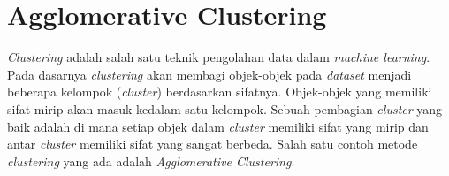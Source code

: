 %
%
%

\section{Agglomerative Clustering}
\label{sec:clustering}
\textit{Clustering} adalah salah satu teknik pengolahan data dalam \textit{machine learning}. Pada dasarnya \textit{clustering} akan membagi objek-objek pada \textit{dataset}  menjadi beberapa kelompok (\textit{cluster}) berdasarkan sifatnya. Objek-objek yang memiliki sifat mirip akan masuk kedalam satu kelompok. Sebuah pembagian \textit{cluster} yang baik adalah di mana setiap objek dalam \textit{cluster} memiliki sifat yang mirip dan antar \textit{cluster} memiliki sifat yang sangat berbeda. Salah satu contoh metode \textit{clustering} yang ada adalah \textit{Agglomerative Clustering}. 

